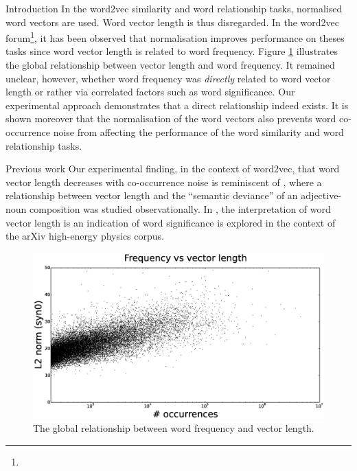 \documentclass{article} %
\begin{document}
\begin{section}{Introduction}
In the word2vec similarity and word relationship tasks, normalised word vectors are used.
Word vector length is thus disregarded.
In the word2vec forum\footnote{\googlegroup}, it has been observed that normalisation improves performance on theses tasks since word vector length is related to word frequency.
Figure \ref{fig:frequency-norm-graph} illustrates the global relationship between vector length and word frequency.
It remained unclear, however, whether word frequency was \textit{directly} related to word vector length or rather via correlated factors such as word significance.
Our experimental approach demonstrates that a direct relationship indeed exists.
It is shown moreover that the normalisation of the word vectors also prevents word co-occurrence noise from affecting the performance of the word similarity and word relationship tasks.

\begin{subsection}{Previous work}
Our experimental finding, in the context of word2vec, that word vector length decreases with co-occurrence noise is reminiscent of \cite{vecchi-baroni-zamparelli2011}, where a relationship between vector length and the ``semantic deviance'' of an adjective-noun composition was studied observationally.
In \cite{schakel-wilson}, the interpretation of word vector length is an indication of word significance is explored in the context of the arXiv high-energy physics corpus.
\end{subsection}
 
\begin{figure}
	\includegraphics[scale=0.3]{frequency-norm-scatterplot}
	\caption{ The global relationship between word frequency and vector length.  }
	\label{fig:frequency-norm-graph}
\end{figure}
\end{section}
\end{document}
